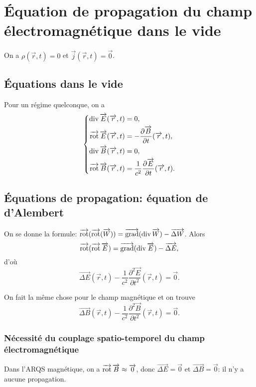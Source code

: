 \section{Équation de propagation du champ électromagnétique dans le vide}

On a $\rho(\vec{r},t)=0$ et $\vec{j}(\vec{r},t)=\vec{0}$.

\subsection{Équations dans le vide}

Pour un régime quelconque, on a 
\begin{equation*}
    \left\lbrace
        \begin{aligned}
            \div\vec{E}(\vec{r},t)&=0,\\
            \vecrot\vec{E}(\vec{r},t)&=-\frac{\partial\vec{B}}{\partial t}(\vec{r},t),\\
            \div\vec{B}(\vec{r},t)&=0,\\
            \vecrot\vec{B}(\vec{r},t)&=\frac{1}{c^{2}}\frac{\partial\vec{E}}{\partial t}(\vec{r},t).
        \end{aligned}
    \right.
\end{equation*}

\subsection{Équations de propagation: équation de d'Alembert}

On se donne la formule: $\vecrot(\vecrot(\vec{W}))=\vecgrad(\div\vec{W})-\vec{\Delta W}$. Alors
\begin{equation*}
    \vecrot(\vecrot\vec{E})=\vecgrad(\div\vec{E})-\vec{\Delta E},
\end{equation*}
d'où
\begin{equation*}
    \boxed{
        \vec{\Delta E}(\vec{r},t)-\frac{1}{c^{2}}\frac{\partial^{2}\vec{E}}{\partial t^{2}}(\vec{r},t)=\vec{0}.
    }
\end{equation*}

On fait la même chose pour le champ magnétique et on trouve
\begin{equation*}
    \boxed{
        \vec{\Delta B}(\vec{r},t)-\frac{1}{c^{2}}\frac{\partial^{2}\vec{B}}{\partial t^{2}}(\vec{r},t)=\vec{0}.
    }
\end{equation*}

\subsubsection{Nécessité du couplage spatio-temporel du champ électromagnétique}

Dans l'ARQS magnétique, on a $\vecrot\vec{B}\approx\vec{0}$, donc $\vec{\Delta E}=\vec{0}$ et $\vec{\Delta B}=\vec{0}$: il n'y a aucune propagation.